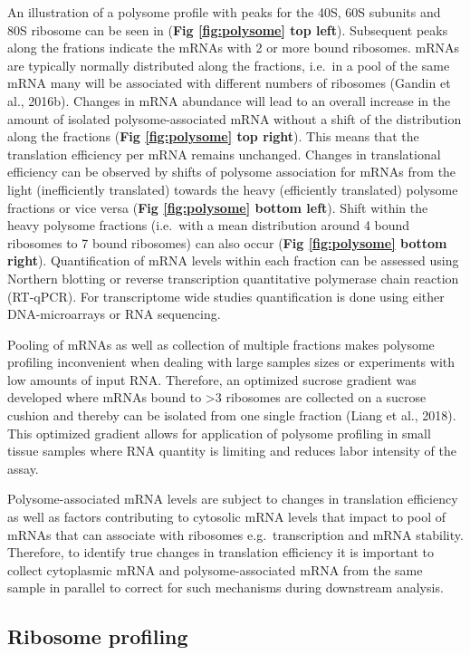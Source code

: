 \documentclass[12pt,openany]{book}
\begin{document}
An illustration of a polysome profile with peaks for the 40S, 60S
subunits and 80S ribosome can be seen in (\textbf{Fig \ref{fig:polysome}
top left}). Subsequent peaks along the frations indicate the mRNAs with
2 or more bound ribosomes. mRNAs are typically normally distributed
along the fractions, i.e.~in a pool of the same mRNA many will be
associated with different numbers of ribosomes (Gandin et al., 2016b).
Changes in mRNA abundance will lead to an overall increase in the amount
of isolated polysome-associated mRNA without a shift of the distribution
along the fractions (\textbf{Fig \ref{fig:polysome} top right}). This
means that the translation efficiency per mRNA remains unchanged.
Changes in translational efficiency can be observed by shifts of
polysome association for mRNAs from the light (inefficiently translated)
towards the heavy (efficiently translated) polysome fractions or vice
versa (\textbf{Fig \ref{fig:polysome} bottom left}). Shift within the
heavy polysome fractions (i.e.~with a mean distribution around 4 bound
ribosomes to 7 bound ribosomes) can also occur (\textbf{Fig
\ref{fig:polysome} bottom right}). Quantification of mRNA levels within
each fraction can be assessed using Northern blotting or reverse
transcription quantitative polymerase chain reaction (RT-qPCR). For
transcriptome wide studies quantification is done using either
DNA-microarrays or RNA sequencing.

Pooling of mRNAs as well as collection of multiple fractions makes
polysome profiling inconvenient when dealing with large samples sizes or
experiments with low amounts of input RNA. Therefore, an optimized
sucrose gradient was developed where mRNAs bound to \textgreater{}3
ribosomes are collected on a sucrose cushion and thereby can be isolated
from one single fraction (Liang et al., 2018). This optimized gradient
allows for application of polysome profiling in small tissue samples
where RNA quantity is limiting and reduces labor intensity of the assay.

Polysome-associated mRNA levels are subject to changes in translation
efficiency as well as factors contributing to cytosolic mRNA levels that
impact to pool of mRNAs that can associate with ribosomes
e.g.~transcription and mRNA stability. Therefore, to identify true
changes in translation efficiency it is important to collect cytoplasmic
mRNA and polysome-associated mRNA from the same sample in parallel to
correct for such mechanisms during downstream analysis.

\subsection{Ribosome profiling} \label{riboseq}
\end{document}
